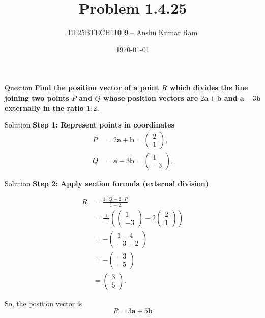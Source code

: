\documentclass{beamer}
\title{Problem 1.4.25}
\author{EE25BTECH11009 – Anshu Kumar Ram}
\date{\today}
\newcommand{\brak}[1]{\begin{pmatrix}#1\end{pmatrix}}
\begin{document}
\begin{frame}
    \titlepage
\end{frame}

\begin{frame}{Question}
    \textbf{Find the position vector of a point \( R \) which divides the line joining two points \( P \) and \( Q \) whose position vectors are \(2\mathbf a + \mathbf b\) and \(\mathbf a - 3\mathbf b\) externally in the ratio \(1:2\).}
\end{frame}

\begin{frame}{Solution}
\textbf{Step 1: Represent points in coordinates}  
\begin{align*}
P &= 2\mathbf a + \mathbf b = \brak{2\\1}, \\
Q &= \mathbf a - 3\mathbf b = \brak{1\\-3}.
\end{align*}
\end{frame}

\begin{frame}{Solution}
\textbf{Step 2: Apply section formula (external division)}

\begin{align*}
R &= \frac{1 \cdot Q - 2 \cdot P}{1 - 2} \\[6pt]
  &= \frac{1}{-1}\left(\begin{pmatrix}1\\-3\end{pmatrix} - 2\begin{pmatrix}2\\1\end{pmatrix}\right) \\[6pt]
  &= -\begin{pmatrix}1-4\\-3-2\end{pmatrix} \\[6pt]
  &= -\begin{pmatrix}-3\\-5\end{pmatrix} \\[6pt]
  &= \begin{pmatrix}3\\5\end{pmatrix}.
\end{align*}

So, the position vector is
\[
\boxed{R = 3\mathbf{a} + 5\mathbf{b}}
\]
\end{frame}
\end{document}
